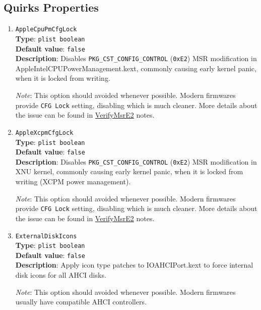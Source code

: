 \documentclass[]{article}
\begin{document}
\subsection{Quirks Properties}\label{kernelpropsquirks}

\begin{enumerate}
\item
  \texttt{AppleCpuPmCfgLock}\\
  \textbf{Type}: \texttt{plist\ boolean}\\
  \textbf{Default value}: \texttt{false}\\
  \textbf{Description}: Disables \texttt{PKG\_CST\_CONFIG\_CONTROL} (\texttt{0xE2})
  MSR modification in AppleIntelCPUPowerManagement.kext, commonly causing early
  kernel panic, when it is locked from writing.

  \emph{Note}: This option should avoided whenever possible. Modern firmwares provide
  \texttt{CFG Lock} setting, disabling which is much cleaner. More details
  about the issue can be found in
  \href{https://github.com/acidanthera/AptioFixPkg#verifymsre2}{VerifyMsrE2} notes.

\item
  \texttt{AppleXcpmCfgLock}\\
  \textbf{Type}: \texttt{plist\ boolean}\\
  \textbf{Default value}: \texttt{false}\\
  \textbf{Description}: Disables \texttt{PKG\_CST\_CONFIG\_CONTROL} (\texttt{0xE2})
  MSR modification in XNU kernel, commonly causing early kernel panic, when it is
  locked from writing (XCPM power management).

  \emph{Note}: This option should avoided whenever possible. Modern firmwares provide
  \texttt{CFG Lock} setting, disabling which is much cleaner. More details
  about the issue can be found in
  \href{https://github.com/acidanthera/AptioFixPkg#verifymsre2}{VerifyMsrE2} notes.

\item
  \texttt{ExternalDiskIcons}\\
  \textbf{Type}: \texttt{plist\ boolean}\\
  \textbf{Default value}: \texttt{false}\\
  \textbf{Description}: Apply icon type patches to IOAHCIPort.kext to force
  internal disk icons for all AHCI disks.

  \emph{Note}: This option should avoided whenever possible. Modern firmwares
  usually have compatible AHCI controllers.


\end{enumerate}
\end{document}
